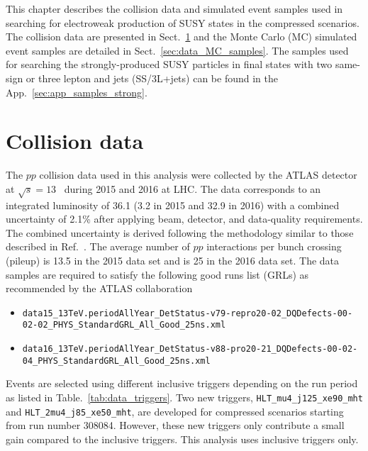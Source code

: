 This chapter describes the collision data and simulated event samples used in searching for electroweak production of SUSY states in the compressed scenarios.
The collision data are presented in Sect.~\ref{sec:data_collision_data} and the Monte Carlo (MC) simulated event samples are detailed in Sect.~\ref{sec:data_MC_samples}.
The samples used for searching the strongly-produced SUSY particles in final states with two same-sign or three lepton and jets (SS/3L+jets) can be found in the App.~\ref{sec:app_samples_strong}.


\section{Collision data}
\label{sec:data_collision_data}
The $pp$ collision data used in this analysis were collected by the ATLAS detector at $\sqrt{s} = 13$~{\TeV} during 2015 and 2016 at LHC.
The data corresponds to an integrated luminosity of 36.1 \ifb (3.2 \ifb in 2015 and 32.9 \ifb in 2016) with a combined uncertainty of 2.1\% after applying beam, detector, and data-quality requirements.
The combined uncertainty is derived following the methodology similar to those described in Ref.~\cite{Aaboud:2016hhf}.
The average number of $pp$ interactions per bunch crossing (pileup) is 13.5 in the 2015 data set and is 25 in the 2016 data set.
The data samples are required to satisfy the following good runs list (GRLs) as recommended by the ATLAS collaboration
%
\begin{itemize}
    \item {\scriptsize \texttt{data15\_13TeV.periodAllYear\_DetStatus-v79-repro20-02\_DQDefects-00-02-02\_PHYS\_StandardGRL\_All\_Good\_25ns.xml}}
    \item {\scriptsize \texttt{data16\_13TeV.periodAllYear\_DetStatus-v88-pro20-21\_DQDefects-00-02-04\_PHYS\_StandardGRL\_All\_Good\_25ns.xml}}
\end{itemize}
%
Events are selected using different inclusive \met triggers depending on the run period as listed in Table.~\ref{tab:data_triggers}.
Two new triggers, \texttt{HLT\_mu4\_j125\_xe90\_mht} and \texttt{HLT\_2mu4\_j85\_xe50\_mht}, are developed for compressed scenarios starting from run number 308084.
However, these new triggers only contribute a small gain compared to the inclusive \met triggers.
This analysis uses inclusive \met triggers only.

